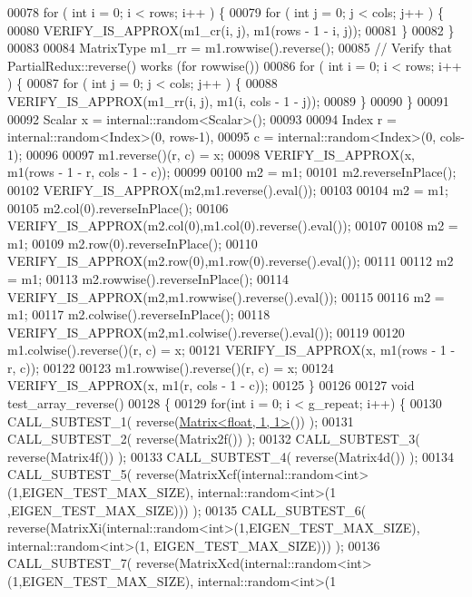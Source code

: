 \begin{DoxyCode}
00078   \textcolor{keywordflow}{for} ( \textcolor{keywordtype}{int} i = 0; i < rows; i++ ) \{
00079     \textcolor{keywordflow}{for} ( \textcolor{keywordtype}{int} j = 0; j < cols; j++ ) \{
00080       VERIFY\_IS\_APPROX(m1\_cr(i, j), m1(rows - 1 - i, j));
00081     \}
00082   \}
00083 
00084   MatrixType m1\_rr = m1.rowwise().reverse();
00085   \textcolor{comment}{// Verify that PartialRedux::reverse() works (for rowwise())}
00086   \textcolor{keywordflow}{for} ( \textcolor{keywordtype}{int} i = 0; i < rows; i++ ) \{
00087     \textcolor{keywordflow}{for} ( \textcolor{keywordtype}{int} j = 0; j < cols; j++ ) \{
00088       VERIFY\_IS\_APPROX(m1\_rr(i, j), m1(i, cols - 1 - j));
00089     \}
00090   \}
00091 
00092   Scalar x = internal::random<Scalar>();
00093 
00094   Index r = internal::random<Index>(0, rows-1),
00095         c = internal::random<Index>(0, cols-1);
00096 
00097   m1.reverse()(r, c) = x;
00098   VERIFY\_IS\_APPROX(x, m1(rows - 1 - r, cols - 1 - c));
00099   
00100   m2 = m1;
00101   m2.reverseInPlace();
00102   VERIFY\_IS\_APPROX(m2,m1.reverse().eval());
00103   
00104   m2 = m1;
00105   m2.col(0).reverseInPlace();
00106   VERIFY\_IS\_APPROX(m2.col(0),m1.col(0).reverse().eval());
00107   
00108   m2 = m1;
00109   m2.row(0).reverseInPlace();
00110   VERIFY\_IS\_APPROX(m2.row(0),m1.row(0).reverse().eval());
00111   
00112   m2 = m1;
00113   m2.rowwise().reverseInPlace();
00114   VERIFY\_IS\_APPROX(m2,m1.rowwise().reverse().eval());
00115   
00116   m2 = m1;
00117   m2.colwise().reverseInPlace();
00118   VERIFY\_IS\_APPROX(m2,m1.colwise().reverse().eval());
00119 
00120   m1.colwise().reverse()(r, c) = x;
00121   VERIFY\_IS\_APPROX(x, m1(rows - 1 - r, c));
00122 
00123   m1.rowwise().reverse()(r, c) = x;
00124   VERIFY\_IS\_APPROX(x, m1(r, cols - 1 - c));
00125 \}
00126 
00127 \textcolor{keywordtype}{void} test\_array\_reverse()
00128 \{
00129   \textcolor{keywordflow}{for}(\textcolor{keywordtype}{int} i = 0; i < g\_repeat; i++) \{
00130     CALL\_SUBTEST\_1( reverse(\hyperlink{group___core___module_class_eigen_1_1_matrix}{Matrix<float, 1, 1>}()) );
00131     CALL\_SUBTEST\_2( reverse(Matrix2f()) );
00132     CALL\_SUBTEST\_3( reverse(Matrix4f()) );
00133     CALL\_SUBTEST\_4( reverse(Matrix4d()) );
00134     CALL\_SUBTEST\_5( reverse(MatrixXcf(internal::random<int>(1,EIGEN\_TEST\_MAX\_SIZE), internal::random<int>(1
      ,EIGEN\_TEST\_MAX\_SIZE))) );
00135     CALL\_SUBTEST\_6( reverse(MatrixXi(internal::random<int>(1,EIGEN\_TEST\_MAX\_SIZE), internal::random<int>(1,
      EIGEN\_TEST\_MAX\_SIZE))) );
00136     CALL\_SUBTEST\_7( reverse(MatrixXcd(internal::random<int>(1,EIGEN\_TEST\_MAX\_SIZE), internal::random<int>(1

\end{DoxyCode}
